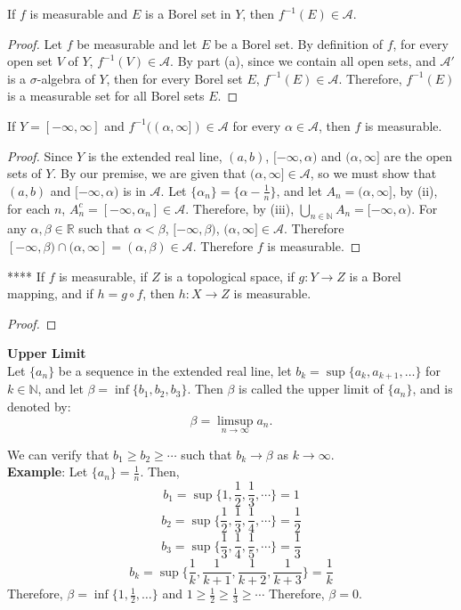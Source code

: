 \documentclass[12pt]{article}
\begin{document}
\noindent If $f$ is measurable and $E$ is a Borel set in $Y$, then $f^{-1}(E) \in \mathcal{A}$.

\begin{proof}
Let $f$ be measurable and let $E$ be a Borel set. By definition of $f$, for every open set $V$ of $Y$, $f^{-1}(V) \in \mathcal{A}$. By part (a), since we contain all open sets, and $\mathcal{A}'$ is a $\sigma$-algebra of $Y$, then for every Borel set $E$, $f^{-1}(E) \in \mathcal{A}$. Therefore, $f^{-1}(E)$ is a measurable set for all Borel sets $E$. 
\end{proof}

\noindent If $Y=[-\infty,\infty]$ and $f^{-1}((\alpha,\infty]) \in \mathcal{A}$ for every $\alpha \in \mathcal{A}$, then $f$ is measurable. 
\begin{proof}
Since $Y$ is the extended real line, $(a,b)$, $[-\infty, \alpha)$ and $(\alpha, \infty]$ are the open sets of $Y$. By our premise, we are given that $(\alpha, \infty] \in \mathcal{A}$, so we must show that $(a,b)$ and $[-\infty, \alpha)$ is in $\mathcal{A}$. Let $\{\alpha_n\}=\{\alpha-\frac{1}{n}\}$, and let $A_n=(\alpha, \infty]$, by (ii), for each $n$, $A_n^c = [-\infty, \alpha_n] \in \mathcal{A}$. Therefore, by (iii), 
$\bigcup_{n\in\mathbb{N}} A_n = [-\infty, \alpha)$. For any $\alpha,\beta \in \mathbb{R}$ such that $\alpha<\beta$, $[-\infty, \beta)$, $(\alpha, \infty] \in \mathcal{A}$. Therefore $[-\infty, \beta) \cap (\alpha, \infty] = (\alpha, \beta) \in \mathcal{A}$. Therefore $f$ is measurable.  
\end{proof}

\noindent ***** If $f$ is measurable, if $Z$ is a topological space, if $g: Y \rightarrow Z$ is a Borel mapping, and if $h = g \circ f$, then $h: X \rightarrow Z$ is measurable. 
\begin{proof}
\end{proof}

\noindent \textbf{Upper Limit} \\
\noindent Let $\{a_n\}$ be a sequence in the extended real line, let $b_k = \sup \{a_k, a_{k+1}, \dots\}$ for $k \in \mathbb{N}$, and let $\beta = \inf\{b_1, b_2, b_3\}$. Then $\beta$ is called the upper limit of $\{a_n\}$, and is denoted by: 
$$\beta = \limsup_{n \rightarrow \infty} a_n.$$

\noindent We can verify that $b_1 \geq b_2 \geq \cdots$ such that $b_k \rightarrow \beta$ as $k \rightarrow \infty$. \\

\noindent \textbf{Example}: Let $\{a_n\} = \frac{1}{n}$. Then,
$$b_1 = \sup \{1, \frac{1}{2}, \frac{1}{3}, \cdots\} = 1$$
$$b_2 = \sup \{\frac{1}{2}, \frac{1}{3}, \frac{1}{4}, \cdots \} = \frac{1}{2}$$
$$b_3 = \sup \{\frac{1}{3}, \frac{1}{4}, \frac{1}{5}, \cdots \} = \frac{1}{3}$$
$$b_k = \sup \{\frac{1}{k}, \frac{1}{k+1}, \frac{1}{k+2}, \frac{1}{k+3}\} = \frac{1}{k}$$
Therefore, $\beta = \inf \{1, \frac{1}{2}, \dots\}$ and $1 \geq \frac{1}{2} \geq \frac{1}{3} \geq \cdots$
Therefore, $\beta = 0$. 
\end{document}
